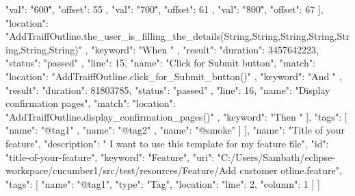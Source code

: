{{{{{                  "val": "\"600\"",
                  "offset": 55
                },
                {
                  "val": "\"700\"",
                  "offset": 61
                },
                {
                  "val": "\"800\"",
                  "offset": 67
                }
              ],
              "location": "AddTraiffOutline.the_user_is_filling_the_details(String,String,String,String,String,String,String)"
            },
            "keyword": "When "
          },
          {
            "result": {
              "duration": 3457642223,
              "status": "passed"
            },
            "line": 15,
            "name": "Click for Submit button",
            "match": {
              "location": "AddTraiffOutline.click_for_Submit_button()"
            },
            "keyword": "And "
          },
          {
            "result": {
              "duration": 81803785,
              "status": "passed"
            },
            "line": 16,
            "name": "Display confirmation pages",
            "match": {
              "location": "AddTraiffOutline.display_confirmation_pages()"
            },
            "keyword": "Then "
          }
        ],
        "tags": [
          {
            "name": "@tag1"
          },
          {
            "name": "@tag2"
          },
          {
            "name": "@smoke"
          }
        ]
      }
    ],
    "name": "Title of your feature",
    "description": "  I want to use this template for my feature file",
    "id": "title-of-your-feature",
    "keyword": "Feature",
    "uri": "C:/Users/Sambath/eclipse-workspace/cucumber1/src/test/resources/Feature/Add customer otline.feature",
    "tags": [
      {
        "name": "@tag1",
        "type": "Tag",
        "location": {
          "line": 2,
          "column": 1
        }
      }
    ]
  }
]